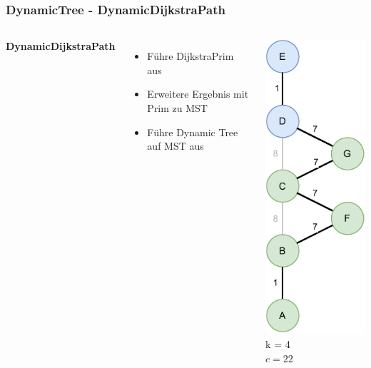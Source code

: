 \documentclass[aspectratio=169]{beamer}
\begin{document}
\begin{frame}
	\frametitle{DynamicTree - DynamicDijkstraPath}
	\begin{columns}[c] %
		
		\textbf{DynamicDijkstraPath}
		\begin{itemize}
			\item Führe DijkstraPrim aus
			\item Erweitere Ergebnis mit Prim zu MST
			\item Führe Dynamic Tree auf MST aus
		\end{itemize}
		\includegraphics[scale=.6]{dynamic_dijkstra.pdf}
		k = 4\\
		$c = 22$
		
		
	\end{columns}
	\end{frame}
	
\end{document}
